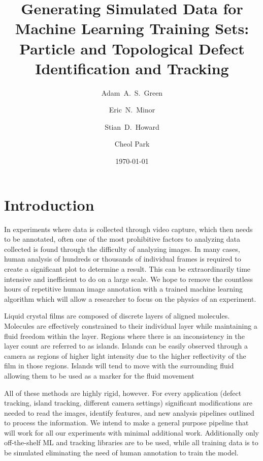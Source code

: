\documentclass[prl,reprint,showpacs,floatfix,nofootinbib]{revtex4-1}
\begin{document}
\title{Generating Simulated Data for Machine Learning Training Sets: Particle and Topological Defect Identification and Tracking}

\date{\today}
\author{Adam~A.~S.~Green}
\author{Eric~N.~Minor}
\author{Stian~D.~Howard}
\author{Cheol Park}


\begin{abstract}
    \blindtext{}
\end{abstract}

\maketitle

\section{Introduction}
In experiments where data is collected through video capture, which then needs to be annotated, often one of the most prohibitive factors to analyzing data collected is found through the difficulty of analyzing images. In many cases, human analysis of hundreds or thousands of individual frames is required to create a significant plot to determine a result. This can be extraordinarily time intensive and inefficient to do on a large scale. We hope to remove the countless hours of repetitive human image annotation with a trained machine learning algorithm which will allow a researcher to focus on the physics of an experiment.

Liquid crystal films are composed of discrete layers of aligned molecules. Molecules are effectively constrained to their individual layer while maintaining a fluid freedom within the layer. Regions where there is an inconsistency in the layer count are referred to as islands. Islands can be easily observed through a camera as regions of higher light intensity due to the higher reflectivity of the film in those regions. Islands will tend to move with the surrounding fluid allowing them to be used as a marker for the fluid movement


All of these methods are highly rigid, however. For every application (defect tracking, island tracking, different camera settings) significant modifications are needed to read the images, identify features, and new analysis pipelines outlined to process the information. We intend to make a general purpose pipeline that will work for all our experiments with minimal additional work. Additionally only off-the-shelf ML and tracking libraries are to be used, while all training data is to be simulated eliminating the need of human annotation to train the model. 
\end{document}
